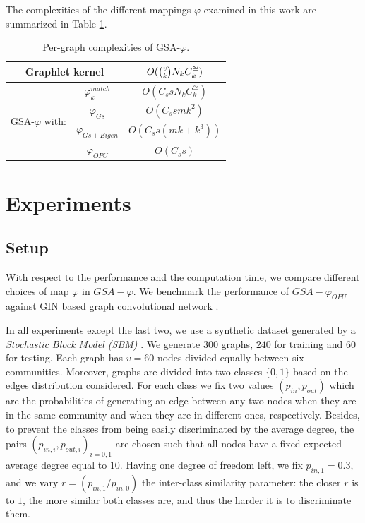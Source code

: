 \documentclass{article}
\begin{document}
The complexities of the different mappings $\varphi$ examined in this work are summarized in Table \ref{tab:cost}.



\begin{table}
\centering
\begin{tabular}{|c|c|c|}
\hline
\multicolumn{2}{|c|}{Graphlet kernel} & $O(\tbinom{v}{k} N_k C^{\cong}_k)$\\ \hline \hline
%
\multirow{4}{*}{GSA-$\varphi$ with:} & $\varphi^{match}_k$ & $O(C_s s N_k C^{\cong}_k)$ \\
& $\varphi_{Gs}$ & $O(C_s s m k^2)$ \\ 
& $\varphi_{Gs+Eigen}$  & $O(C_s s (m k + k^3))$ \\ 
& $\varphi_{OPU}$  & $O(C_s s)$ \\ \hline
\end{tabular}
\caption{Per-graph complexities of GSA-$\varphi$.}
\label{tab:cost}
\end{table}


\section{Experiments}\label{sec:experiments}
\subsection{Setup}\label{sec:setup}
With respect to the performance and  the computation time, we compare different choices of  map $\varphi$ in $GSA-\varphi$. We benchmark the performance of $GSA-\varphi_{OPU}$ against GIN based graph convolutional network \cite{GCN_powerful}.

In all experiments except the last two, we use a synthetic dataset generated by a \emph{Stochastic Block Model (SBM)} \cite{SBM}. We generate $300$ graphs, $240$ for training  and $60$ for testing. Each graph has $v=60$ nodes divided equally between six communities. Moreover, graphs are divided into two classes $\{0 , 1\}$ based on the edges distribution considered. For each class we fix two values $(p_{in} , p_{out})$ which are  the probabilities of generating an edge between any two nodes when they are in the same community and when they are in different ones, respectively. Besides, to prevent the classes from being easily discriminated by the average degree, the pairs $(p_{in,i} , p_{out,i})_{i=0,1}$ are chosen such that all nodes have a fixed expected average degree equal to $10$. Having one degree of freedom left, we fix $p_{in,1}=0.3$, and we vary $r=(p_{in,1}/p_{in,0})$ the inter-class similarity parameter: the closer $r$ is to $1$, the more similar both classes are, and thus the harder it is to discriminate them.
\end{document}
